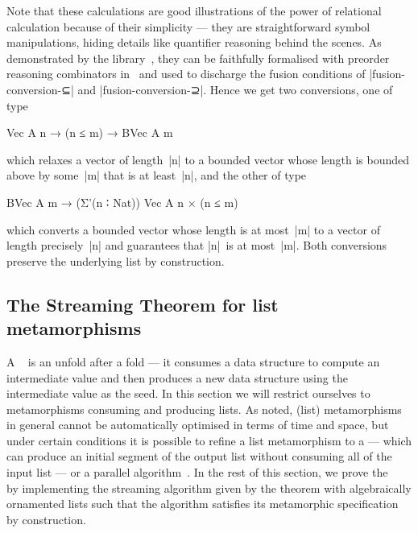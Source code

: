 Note that these calculations are good illustrations of the power of relational calculation because of their simplicity --- they are straightforward symbol manipulations, hiding details like quantifier reasoning behind the scenes.
As demonstrated by the  library~\citep{Mu-AoPA}, they can be faithfully formalised with preorder reasoning combinators in \Agda\ and used to discharge the fusion conditions of |fusion-conversion-⊆| and |fusion-conversion-⊇|.
Hence we get two conversions, one of type
\begin{code}
Vec A n → (n ≤ m) → BVec A m
\end{code}
which relaxes a vector of length~|n| to a bounded vector whose length is bounded above by some~|m| that is at least~|n|, and the other of type
\begin{code}
BVec A m → (Σ'(n ∶ Nat)) Vec A n × (n ≤ m)
\end{code}
which converts a bounded vector whose length is at most~|m| to a vector of length precisely~|n| and guarantees that |n|~is at most~|m|.
Both conversions preserve the underlying list by construction.

\subsection{The Streaming Theorem for list metamorphisms}
\label{sec:metamorphism-streaming}

A ~\citep{Gibbons-metamorphisms} is an unfold after a fold --- it consumes a data structure to compute an intermediate value and then produces a new data structure using the intermediate value as the seed.
In this section we will restrict ourselves to metamorphisms consuming and producing lists.
As \citeauthor{Gibbons-metamorphisms} noted, (list) metamorphisms in general cannot be automatically optimised in terms of time and space, but under certain conditions it is possible to refine a list metamorphism to a  --- which can produce an initial segment of the output list without consuming all of the input list --- or a parallel algorithm~\citep{Nakano-jigsaw}.
In the rest of this section, we prove the ~\citep[Theorem~30]{Bird-arithmetic-coding} by implementing the streaming algorithm given by the theorem with algebraically ornamented lists such that the algorithm satisfies its metamorphic specification by construction.

